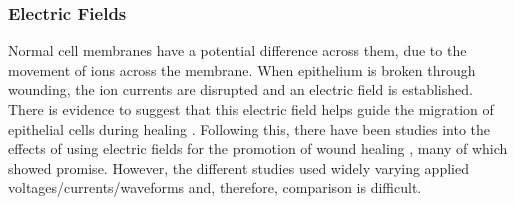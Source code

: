 \documentclass[11pt, oneside]{article}   	%
\newcommand{\todo}[1]{ \textcolor{red}{\bf{To Do:} #1}}
\begin{document}
\subsubsection{Electric Fields}

Normal cell membranes have a potential difference across them, due to the movement of ions across the membrane.
When epithelium is broken through wounding, the ion currents are disrupted and an electric field is established.
There is evidence to suggest that this electric field helps guide the migration of epithelial cells during healing \cite{Zhao2009electrical}.
Following this, there have been studies into the effects of using electric fields for the promotion of wound healing \cite{Thakral2013electrical, Messerli2011extracellular}, many of which showed promise.
However, the different studies used widely varying applied voltages/currents/waveforms and, therefore, comparison is difficult.


%
\end{document}
